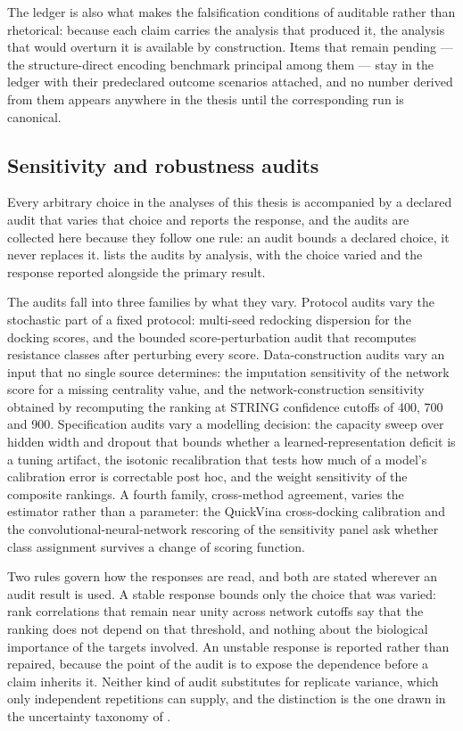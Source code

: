 The ledger is also what makes the falsification conditions of  auditable rather than rhetorical: because each claim carries the analysis that produced it, the analysis that would overturn it is available by construction. Items that remain pending --- the structure-direct encoding benchmark principal among them --- stay in the ledger with their predeclared outcome scenarios attached, and no number derived from them appears anywhere in the thesis until the corresponding run is canonical.

\subsection{Sensitivity and robustness audits}

Every arbitrary choice in the analyses of this thesis is accompanied by a declared audit that varies that choice and reports the response, and the audits are collected here because they follow one rule: an audit bounds a declared choice, it never replaces it.  lists the audits by analysis, with the choice varied and the response reported alongside the primary result.

The audits fall into three families by what they vary. Protocol audits vary the stochastic part of a fixed protocol: multi-seed redocking dispersion for the docking scores, and the bounded score-perturbation audit that recomputes resistance classes after perturbing every score. Data-construction audits vary an input that no single source determines: the imputation sensitivity of the network score for a missing centrality value, and the network-construction sensitivity obtained by recomputing the ranking at STRING confidence cutoffs of \num{400}, \num{700} and \num{900}. Specification audits vary a modelling decision: the capacity sweep over hidden width and dropout that bounds whether a learned-representation deficit is a tuning artifact, the isotonic recalibration that tests how much of a model's calibration error is correctable post hoc, and the weight sensitivity of the composite rankings. A fourth family, cross-method agreement, varies the estimator rather than a parameter: the QuickVina cross-docking calibration and the convolutional-neural-network rescoring of the sensitivity panel ask whether class assignment survives a change of scoring function.

Two rules govern how the responses are read, and both are stated wherever an audit result is used. A stable response bounds only the choice that was varied: rank correlations that remain near unity across network cutoffs say that the ranking does not depend on that threshold, and nothing about the biological importance of the targets involved. An unstable response is reported rather than repaired, because the point of the audit is to expose the dependence before a claim inherits it. Neither kind of audit substitutes for replicate variance, which only independent repetitions can supply, and the distinction is the one drawn in the uncertainty taxonomy of .

